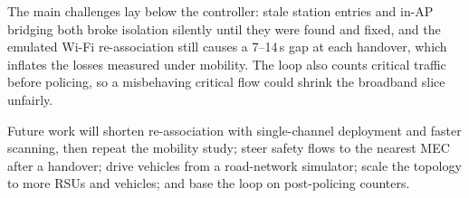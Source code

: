 \documentclass[conference]{IEEEtran}
\begin{document}
The main challenges lay below the controller: stale station entries and in-AP bridging both broke isolation silently until they were found and fixed, and the emulated Wi-Fi re-association still causes a 7--14\,s gap at each handover, which inflates the losses measured under mobility. The loop also counts critical traffic before policing, so a misbehaving critical flow could shrink the broadband slice unfairly.

Future work will shorten re-association with single-channel deployment and faster scanning, then repeat the mobility study; steer safety flows to the nearest MEC after a handover; drive vehicles from a road-network simulator; scale the topology to more RSUs and vehicles; and base the loop on post-policing counters.



\end{document}
